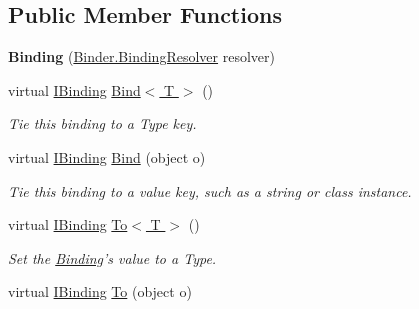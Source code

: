 \subsection*{Public Member Functions}
\begin{DoxyCompactItemize}
\item 
\hypertarget{classstrange_1_1framework_1_1impl_1_1_binding_a50906fc241f67a1b588eebec8266a50e}{{\bfseries Binding} (\hyperlink{classstrange_1_1framework_1_1impl_1_1_binder_aa4e977fc31063ca4d0b029b1abe39dad}{Binder.\-Binding\-Resolver} resolver)}\label{classstrange_1_1framework_1_1impl_1_1_binding_a50906fc241f67a1b588eebec8266a50e}

\item 
\hypertarget{classstrange_1_1framework_1_1impl_1_1_binding_ac8340be8eb6c057832469724292a17cd}{virtual \hyperlink{interfacestrange_1_1framework_1_1api_1_1_i_binding}{I\-Binding} \hyperlink{classstrange_1_1framework_1_1impl_1_1_binding_ac8340be8eb6c057832469724292a17cd}{Bind$<$ T $>$} ()}\label{classstrange_1_1framework_1_1impl_1_1_binding_ac8340be8eb6c057832469724292a17cd}

\begin{DoxyCompactList}\small\item\em Tie this binding to a Type key. \end{DoxyCompactList}\item 
\hypertarget{classstrange_1_1framework_1_1impl_1_1_binding_a08278e2afe72ad137cacf72ff71d4858}{virtual \hyperlink{interfacestrange_1_1framework_1_1api_1_1_i_binding}{I\-Binding} \hyperlink{classstrange_1_1framework_1_1impl_1_1_binding_a08278e2afe72ad137cacf72ff71d4858}{Bind} (object o)}\label{classstrange_1_1framework_1_1impl_1_1_binding_a08278e2afe72ad137cacf72ff71d4858}

\begin{DoxyCompactList}\small\item\em Tie this binding to a value key, such as a string or class instance. \end{DoxyCompactList}\item 
\hypertarget{classstrange_1_1framework_1_1impl_1_1_binding_af98b1180c87ab8f34268eb0916c7ba84}{virtual \hyperlink{interfacestrange_1_1framework_1_1api_1_1_i_binding}{I\-Binding} \hyperlink{classstrange_1_1framework_1_1impl_1_1_binding_af98b1180c87ab8f34268eb0916c7ba84}{To$<$ T $>$} ()}\label{classstrange_1_1framework_1_1impl_1_1_binding_af98b1180c87ab8f34268eb0916c7ba84}

\begin{DoxyCompactList}\small\item\em Set the \hyperlink{classstrange_1_1framework_1_1impl_1_1_binding}{Binding}'s value to a Type. \end{DoxyCompactList}\item 
\hypertarget{classstrange_1_1framework_1_1impl_1_1_binding_a8459c625c1e51c9fee37bfeac10fbabf}{virtual \hyperlink{interfacestrange_1_1framework_1_1api_1_1_i_binding}{I\-Binding} \hyperlink{classstrange_1_1framework_1_1impl_1_1_binding_a8459c625c1e51c9fee37bfeac10fbabf}{To} (object o)}\label{classstrange_1_1framework_1_1impl_1_1_binding_a8459c625c1e51c9fee37bfeac10fbabf}


\end{DoxyCompactItemize}
